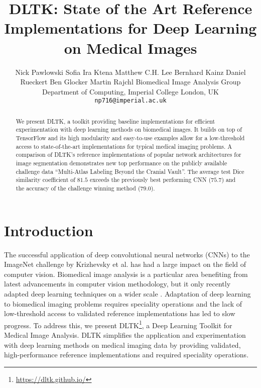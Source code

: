 \documentclass{article}
\title{DLTK: State of the Art Reference Implementations for Deep Learning on Medical Images} %
\author{Nick Pawlowski \And Sofia Ira Ktena \And Matthew C.H. Lee \AND Bernhard Kainz \And Daniel Rueckert \And Ben Glocker \And Martin Rajchl \AND
Biomedical Image Analysis Group\\Department of Computing, Imperial College London, UK\\
\texttt{np716@imperial.ac.uk}
}
\begin{document}

\maketitle

\begin{abstract}
We present DLTK, a toolkit providing baseline implementations for efficient experimentation with deep learning methods on biomedical images. It builds on top of TensorFlow and its high modularity and easy-to-use examples allow for a low-threshold access to state-of-the-art implementations for typical medical imaging problems. A comparison of DLTK's reference implementations of popular network architectures for image segmentation demonstrates new top performance on the publicly available challenge data ``Multi-Atlas Labeling Beyond the Cranial Vault''. The average test Dice similarity coefficient of $81.5$ exceeds the previously best performing CNN ($75.7$) and the accuracy of the challenge winning method ($79.0$).
\end{abstract}

\section{Introduction}
The successful application of deep convolutional neural networks (CNNs) to the ImageNet challenge \cite{Russakovsky2015} by Krizhevsky et al. \cite{Krizhevsky2012} has had a large impact on the field of computer vision. Biomedical image analysis is a particular area benefiting from latest advancements in computer vision methodology, but it only recently adapted deep learning techniques on a wider scale \cite{Litjens2017}.
Adaptation of deep learning to biomedical imaging problems requires speciality operations and the lack of low-threshold access to validated reference implementations has led to slow progress. To address this, we present DLTK\footnote{\url{https://dltk.github.io/}}, a Deep Learning Toolkit for Medical Image Analysis. DLTK simplifies the application and experimentation with deep learning methods on medical imaging data by providing validated, high-performance reference implementations and required speciality operations.
\end{document}
